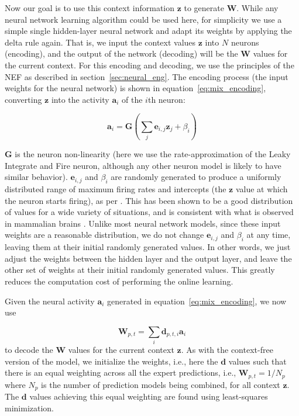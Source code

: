 Now our goal is to use this context information $\mathbf{z}$ to generate $\mathbf{W}$.
While any neural network learning algorithm could be used here, for simplicity we use a simple single hidden-layer neural network and adapt its weights by applying the delta rule again.
That is, we input the context values $\mathbf{z}$ into $N$ neurons (encoding), and the output of the network (decoding) will be the $\mathbf{W}$ values for the current context.
For this encoding and decoding, we use the principles of the \acf{NEF} as described in section~\ref{sec:neural_eng}.
The encoding process (the input weights for the neural network) is shown in equation~\eqref{eq:mix_encoding}, converting $\mathbf{z}$ into the activity $\mathbf{a}_i$ of the $i$th neuron:

\begin{equation}
  \mathbf{a}_{i} = \mathbf{G} \left(\sum_{j} \mathbf{e}_{i,j}\mathbf{z}_j+\beta_i\right)
  \label{eq:mix_encoding}
\end{equation}

$\mathbf{G}$ is the neuron non-linearity (here we use the rate-approximation of the Leaky Integrate and Fire neuron, although any other neuron model is likely to have similar behavior).
$\mathbf{e}_{i,j}$ and $\beta_i$ are randomly generated to produce a uniformly distributed range of maximum firing rates and intercepts (the $\mathbf{z}$ value at which the neuron starts firing), as per \cite{Eliasmith2013}. 
This has been shown to be a good distribution of values for a wide variety of situations, and is consistent with what is observed in mammalian brains \cite{Eliasmith2013}.
Unlike most neural network models, since these input weights are a reasonable distribution, we do not change $\mathbf{e}_{i,j}$ and $\beta_i$ at any time, leaving them at their initial randomly generated values.
In other words, we just adjust the weights between the hidden layer and the output layer, and leave the other set of weights at their initial randomly generated values.
This greatly reduces the computation cost of performing the online learning.

Given the neural activity $\mathbf{a}_i$ generated in equation~\eqref{eq:mix_encoding}, we now use 

\begin{equation}
  \mathbf{W}_{p,t} = \sum_{i} \mathbf{d}_{p,t,i}\mathbf{a}_i
  \label{eq:mix_decoding}
\end{equation}
to decode the $\mathbf{W}$ values for the current context $\mathbf{z}$. 
As with the context-free version of the model, we initialize the weights, i.e., here the $\mathbf{d}$ values such that there is an equal weighting across all the expert predictions, i.e., $\mathbf{W}_{p,t} = 1/N_p$ where $N_p$ is the number of prediction models being combined, for all context $\mathbf{z}$.
The $\mathbf{d}$ values achieving this equal weighting are found using least-squares minimization.

